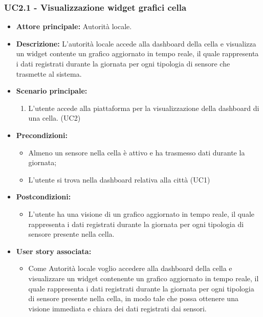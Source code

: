 \subsubsection{UC2.1 - Visualizzazione widget grafici cella}
\begin{itemize}
    \item \textbf{Attore principale:} Autorità locale.
    \item \textbf{Descrizione:} L'autorità locale accede alla dashboard della cella e visualizza un widget contente un grafico aggiornato in tempo reale, il quale rappresenta i dati registrati durante la giornata per ogni tipologia di sensore che trasmette al sistema.
    \item \textbf{Scenario principale:}
          \begin{enumerate}
            \item L'utente accede alla piattaforma per la visualizzazione della dashboard di una cella. (UC2)
          \end{enumerate}
    \item \textbf{Precondizioni:}
          \begin{itemize}
              \item  Almeno un sensore nella cella è attivo e ha trasmesso dati durante la giornata;
              \item L'utente si trova nella dashboard relativa alla città (UC1)
          \end{itemize}
    \item \textbf{Postcondizioni:}
          \begin{itemize}
              \item      L'utente ha una visione di un grafico aggiornato in tempo reale, il quale rappresenta i dati registrati durante la giornata per ogni tipologia di sensore presente nella cella.
          \end{itemize}
    \item \textbf{User story associata:}
          \begin{itemize}
              \item Come Autorità locale voglio accedere alla dashboard della cella e visualizzare un widget contenente un grafico aggiornato in tempo reale, il quale rappresenta i dati registrati durante la giornata per ogni tipologia di sensore presente nella cella,
                    in modo tale che possa ottenere una visione immediata e chiara dei dati registrati dai sensori.
          \end{itemize}
\end{itemize}